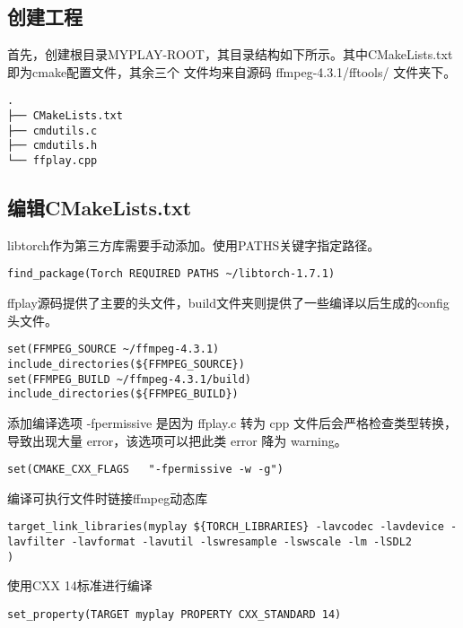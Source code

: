 \subsection{创建工程}

首先，创建根目录MYPLAY-ROOT，其目录结构如下所示。其中CMakeLists.txt即为cmake配置文件，其余三个
文件均来自源码 ffmpeg-4.3.1/fftools/ 文件夹下。

\begin{lstlisting}
.
├── CMakeLists.txt
├── cmdutils.c
├── cmdutils.h
└── ffplay.cpp
\end{lstlisting}

\subsection{编辑CMakeLists.txt}

libtorch作为第三方库需要手动添加。使用PATHS关键字指定路径。

\begin{lstlisting}
find_package(Torch REQUIRED PATHS ~/libtorch-1.7.1)
\end{lstlisting}

ffplay源码提供了主要的头文件，build文件夹则提供了一些编译以后生成的config头文件。

\begin{lstlisting}
set(FFMPEG_SOURCE ~/ffmpeg-4.3.1)
include_directories(${FFMPEG_SOURCE})
set(FFMPEG_BUILD ~/ffmpeg-4.3.1/build)
include_directories(${FFMPEG_BUILD})
\end{lstlisting}

添加编译选项 -fpermissive 是因为 ffplay.c 转为 cpp 文件后会严格检查类型转换，导致出现大量
error，该选项可以把此类 error 降为 warning。

\begin{lstlisting}
set(CMAKE_CXX_FLAGS   "-fpermissive -w -g")
\end{lstlisting}

编译可执行文件时链接ffmpeg动态库

\begin{lstlisting}
target_link_libraries(myplay ${TORCH_LIBRARIES} -lavcodec -lavdevice -lavfilter -lavformat -lavutil -lswresample -lswscale -lm -lSDL2
)
\end{lstlisting}

使用CXX 14标准进行编译

\begin{lstlisting}
set_property(TARGET myplay PROPERTY CXX_STANDARD 14)
\end{lstlisting}

